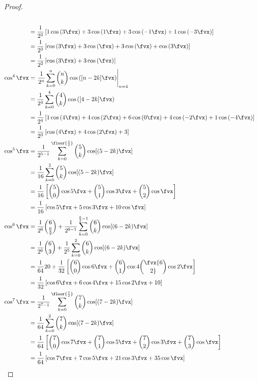 \begin{proof}
\begin{align*}
  \\&= \frac{1}{2^3} \left[
         1\cos\left( 3\fvx\right) +
         3\cos\left( 1\fvx\right) +
         3\cos\left(-1\fvx\right) +
         1\cos\left(-3\fvx\right) 
       \right]
  \\&= \frac{1}{2^3} \left[
          \cos\left( 3\fvx\right) +
         3\cos\left(  \fvx\right) +
         3\cos\left(  \fvx\right) +
          \cos\left( 3\fvx\right) 
       \right]
  \\&= \frac{1}{2^2} \left[
          \cos\left( 3\fvx\right) +
         3\cos\left(  \fvx\right) 
       \right]
  \\
  \cos^4\fvx
    &= \left.\frac{1}{2^n} \sum_{k=0}^n {n\choose k}\cos\left([n-2k]\fvx\right)\right|_{n=4}
  \\&= \frac{1}{2^4} \sum_{k=0}^4 {4\choose k}\cos\left([4-2k]\fvx\right)
  \\&= \frac{1}{2^4} \left[
         1\cos\left( 4\fvx\right) +
         4\cos\left( 2\fvx\right) +
         6\cos\left( 0\fvx\right) +
         4\cos\left(-2\fvx\right) +
         1\cos\left(-4\fvx\right) 
       \right]
  \\&= \frac{1}{2^3} \left[
          \cos\left( 4\fvx\right) +
         4\cos\left( 2\fvx\right) +
         3 
       \right]
  \\
  \cos^5\fvx
    &= \frac{1}{2^{5-1}} \sum_{k=0}^{\floor{\frac{5}{2}}} {5\choose k}\cos[(5-2k)\fvx] 
  \\&= \frac{1}{16} \sum_{k=0}^2 {5\choose k}\cos[(5-2k)\fvx] 
  \\&= \frac{1}{16} 
       \left[
         {5\choose 0}\cos5\fvx + {5\choose1}\cos3\fvx + 
         {5\choose2}\cos\fvx 
       \right]
  \\&= \frac{1}{16} \left[\cos5\fvx + 5\cos3\fvx + 10\cos\fvx \right]
  \\
  \cos^6\fvx
    &= \frac{1}{2^6}{6\choose\frac{6}{2}} + 
       \frac{1}{2^{6-1}} \sum_{k=0}^{\frac{6}{2}-1} {6\choose k}\cos[(6-2k)\fvx] 
  \\&= \frac{1}{2^6}{6\choose3} + 
       \frac{1}{2^5}\sum_{k=0}^{2} {6\choose k}\cos[(6-2k)\fvx] 
  \\&= \frac{1}{64}20 + 
       \frac{1}{32}\left[
         {6\choose0}\cos6\fvx + {6\choose1}\cos4\fvx 
         {6\choose2}\cos2\fvx 
         \right]
  \\&= \frac{1}{32}\left[\cos6\fvx + 6\cos4\fvx + 15\cos2\fvx + 10\right]
  \\
  \cos^7\fvx
    &= \frac{1}{2^{7-1}} \sum_{k=0}^{\floor{\frac{7}{2}}} {7\choose k}\cos[(7-2k)\fvx] 
  \\&= \frac{1}{64} \sum_{k=0}^2 {7\choose k}\cos[(7-2k)\fvx] 
  \\&= \frac{1}{64} 
       \left[
         {7\choose 0}\cos7\fvx + {7\choose 1}\cos5\fvx + {7\choose2}\cos3\fvx + 
         {7\choose3}\cos\fvx 
       \right]
  \\&= \frac{1}{64} \left[\cos7\fvx + 7\cos5\fvx + 21\cos3\fvx + 35\cos\fvx \right]
\end{align*}


\end{proof}
